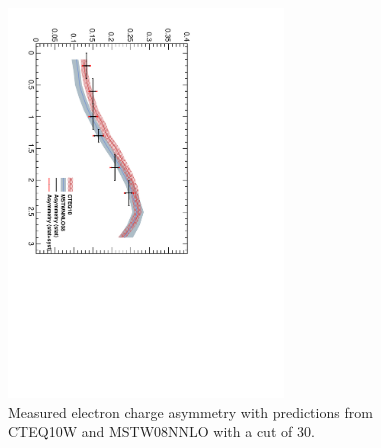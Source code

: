 \begin{figure}[htbp]
  \begin{center}
  \includegraphics*[width=0.65\textwidth,angle=90]{Asym_30}
  \caption[Measured electron charge asymmetry with a \pT cut of {\unit{30}{\GeV}}.]
{\label{fig:asym30} Measured electron charge asymmetry with predictions from
CTEQ10W and MSTW08NNLO with a \pT cut of \unit{30}{\GeV}\cite{baisini2010electron}.}
  \end{center}
\end{figure}

